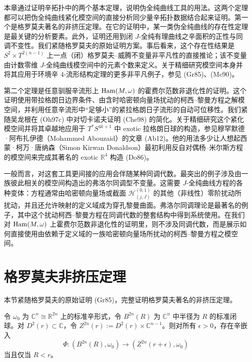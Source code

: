 本章通过证明辛拓扑中的两个基本定理，说明伪全纯曲线工具的用法。这两个定理都可以把伪全纯曲线紧化模空间的直接分析同少量辛拓扑数据结合起来证明。第一个是格罗莫夫著名的非挤压定理。在它的证明中，某一类伪全纯曲线的存在性定理是最关键的分析要素。此外，证明还用到闭 $J$-全纯有理曲线之辛面积的正性与同调不变性。我们紧随格罗莫夫的原始证明方案。事后看来，这个存在性结果是
$S^2\times T^{2(n-1)}$ 上一点（闭）格罗莫夫--威腾不变量非平凡性的直接推论；该不变量由计数零维 $J$-全纯曲线模空间中的元素个数来定义。关于精细研究模空间本身并将其应用于环境辛 $4$-流形结构定理的更多非平凡例子，参见 (Gr85)、(Mc90)。

第二个定理是任意驯服辛流形上 $\operatorname{Ham}(M,\omega)$ 的霍费尔范数非退化性的证明。这个证明使用带拉格朗日边界条件、由含时哈密顿向量场扰动的柯西--黎曼方程之解模空间，并利用任意辛流形中“足够小”的紧拉格朗日子流形的自动可位移性。我们紧随吴龙根在 (Oh97c) 中对切卡诺夫证明 (Che98) 的简化。关于精细研究这个紧化模空间并将其卓越地应用于 $T^*S^{4k+1}$ 中 exotic 拉格朗日球的构造，参见穆罕默德·阿布扎伊德（Mohammed Abouzaid）的文章 (Ab12)。他的用法多少让人想起西蒙·柯万·唐纳森（Simon Kirwan Donaldson）最初利用反自对偶杨--米尔斯方程的模空间来完成其著名的 exotic $\mathbb R^4$ 构造 (Do86)。

一般而言，对这套工具更间接的应用会伴随某种同调代数。最突出的例子涉及由一族彼此相关的模空间构造出的弗洛尔同调型不变量。这需要 $J$-全纯曲线方程的各种变体：方程通常由哈密顿向量场或截面 $\mathcal H_{(j,J)}^{(0,1)}$ 的其他（非线性）零阶扰动所扰动，并且还允许映射的定义域成为穿孔黎曼曲面。弗洛尔同调理论是最著名的例子，其中这个扰动柯西--黎曼方程在同调代数的整套结构中得到系统使用。在我们对 $\operatorname{Ham}(M,\omega)$ 上霍费尔范数非退化性的证明里，则不涉及同调代数，而是展示如何直接使用由依赖于定义域的一族哈密顿向量场所扰动的柯西--黎曼方程之模空间。

\section{格罗莫夫非挤压定理}
\label{sec:gromov-non-squeezing-theorem}

本节紧随格罗莫夫的原始证明 (Gr85)，完整证明格罗莫夫著名的非挤压定理。

\begin{theorem}[非挤压定理]\label{thm:gromov-non-squeezing}
令 $\omega_0$ 为 $\mathbb C^n\cong\mathbb R^{2n}$ 上的标准辛形式，令 $B^{2n}(R)$ 为 $\mathbb C^n$ 中半径为 $R$ 的标准闭球。对 $D^2(r)\subset\mathbb C$，令
$Z^{2n}(r):=D^2(r)\times\mathbb C^{n-1}$。则对所有 $\epsilon>0$，存在辛嵌入
\[
 \Phi:(B^{2n}(R),\omega_0)\longrightarrow(Z^{2n}(r+\epsilon),\omega_0)
\]
当且仅当 $R<r$。
\end{theorem}

